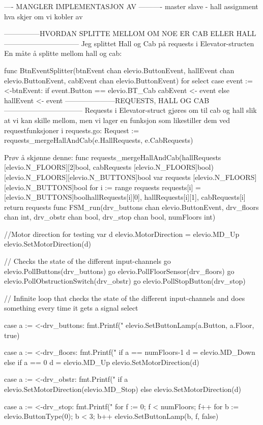 ---- MANGLER IMPLEMENTASJON AV ----------
master slave - hall assignment
hva skjer om vi kobler av

---------------HVORDAN SPLITTE MELLOM OM NOE ER CAB ELLER HALL--------------------------------
Jeg splittet Hall og Cab på requests i Elevator-structen
En måte å splitte mellom hall og cab:

func BtnEventSplitter(btnEvent chan elevio.ButtonEvent,
	hallEvent chan elevio.ButtonEvent,
	cabEvent chan elevio.ButtonEvent) {
	for {
		select {
		case event := <-btnEvent:
			if event.Button == elevio.BT_Cab {
				cabEvent <- event
			} else {
				hallEvent <- event
			}
		}
	}
}
---------------------REQUESTS, HALL OG CAB---------------------------------
Requests i Elevator-struct gjøres om til cab og hall slik at vi kan skille mellom, men vi lager en funksjon 
som likestiller dem ved requestfunksjoner i requests.go:
Request := requests_mergeHallAndCab(e.HallRequests, e.CabRequests)

Prøv å skjønne denne: 
func requests_mergeHallAndCab(hallRequests [elevio.N_FLOORS][2]bool, cabRequests [elevio.N_FLOORS]bool) [elevio.N_FLOORS][elevio.N_BUTTONS]bool {
	var requests [elevio.N_FLOORS][elevio.N_BUTTONS]bool
	for i := range requests {
		requests[i] = [elevio.N_BUTTONS]bool{hallRequests[i][0], hallRequests[i][1], cabRequests[i]}
	}
	return requests
}
func FSM_run(drv_buttons chan elevio.ButtonEvent, drv_floors chan int, drv_obstr chan bool, drv_stop chan bool, numFloors int) {

	//Motor direction for testing
	var d elevio.MotorDirection = elevio.MD_Up
	elevio.SetMotorDirection(d)


	// Checks the state of the different input-channels
	go elevio.PollButtons(drv_buttons)
	go elevio.PollFloorSensor(drv_floors)
	go elevio.PollObstructionSwitch(drv_obstr)
	go elevio.PollStopButton(drv_stop)

	// Infinite loop that checks the state of the different input-channels and does something every time it gets a signal
	select {
	case a := <-drv_buttons:
		fmt.Printf("%
		elevio.SetButtonLamp(a.Button, a.Floor, true)

	case a := <-drv_floors:
		fmt.Printf("%
		if a == numFloors-1 {
			d = elevio.MD_Down
		} else if a == 0 {
			d = elevio.MD_Up
		}
		elevio.SetMotorDirection(d)

	case a := <-drv_obstr:
		fmt.Printf("%
		if a {
			elevio.SetMotorDirection(elevio.MD_Stop)
		} else {
			elevio.SetMotorDirection(d)
		}

	case a := <-drv_stop:
		fmt.Printf("%
		for f := 0; f < numFloors; f++ {
			for b := elevio.ButtonType(0); b < 3; b++ {
				elevio.SetButtonLamp(b, f, false)
			}
		}
	}

}

